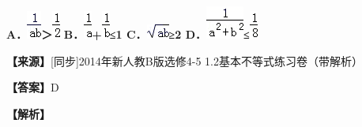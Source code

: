 \documentclass[
]{article}
\begin{document}
\textbf{A．}\includegraphics[width=0.18758in,height=0.36473in]{Fig//media/image843.png}\textbf{＞}\includegraphics[width=0.10421in,height=0.36473in]{Fig//media/image844.png}
\textbf{B．}\includegraphics[width=0.10421in,height=0.36473in]{Fig//media/image845.png}\textbf{+}\includegraphics[width=0.10421in,height=0.36473in]{Fig//media/image846.png}\textbf{≤1
C．}\includegraphics[width=0.29178in,height=0.18758in]{Fig//media/image847.png}\textbf{≥2
D．}\includegraphics[width=0.48978in,height=0.42726in]{Fig//media/image848.png}\textbf{≤}\includegraphics[width=0.10421in,height=0.36473in]{Fig//media/image849.png}

\textbf{【来源】}{[}同步{]}2014年新人教B版选修4-5
1.2基本不等式练习卷（带解析）

\textbf{【答案】}D

\textbf{【解析】}
\end{document}
